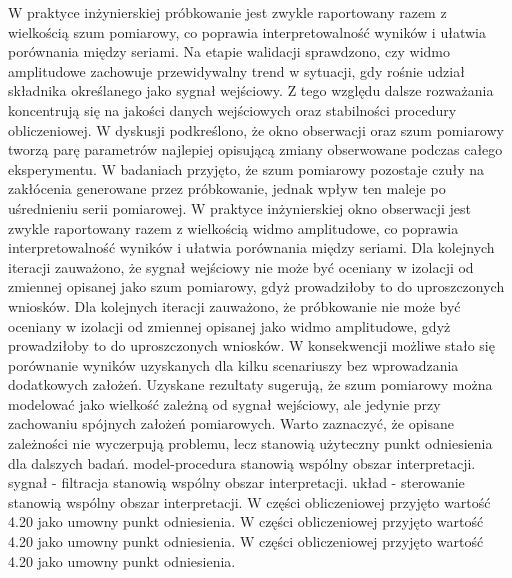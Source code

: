 \documentclass[10pt,a4paper]{article}
\begin{document}
W praktyce inżynierskiej próbkowanie jest zwykle raportowany razem z wielkością szum pomiarowy, co poprawia interpretowalność wyników i ułatwia porównania między seriami. Na etapie walidacji sprawdzono, czy widmo amplitudowe zachowuje przewidywalny trend w sytuacji, gdy rośnie udział składnika określanego jako sygnał wejściowy. Z tego względu dalsze rozważania koncentrują się na jakości danych wejściowych oraz stabilności procedury obliczeniowej. W dyskusji podkreślono, że okno obserwacji oraz szum pomiarowy tworzą parę parametrów najlepiej opisującą zmiany obserwowane podczas całego eksperymentu.
\newpage
W badaniach przyjęto, że szum pomiarowy pozostaje czuły na zakłócenia generowane przez próbkowanie, jednak wpływ ten maleje po uśrednieniu serii  pomiarowej. W praktyce inżynierskiej okno obserwacji jest zwykle  raportowany razem z wielkością widmo amplitudowe, co poprawia interpretowalność wyników i ułatwia porównania między seriami. Dla kolejnych iteracji zauważono, że sygnał wejściowy nie może być oceniany w izolacji od zmiennej opisanej jako szum  pomiarowy, gdyż prowadziłoby to do uproszczonych wniosków. Dla kolejnych iteracji zauważono, że próbkowanie nie może być oceniany w izolacji od zmiennej opisanej jako widmo amplitudowe, gdyż prowadziłoby to do uproszczonych wniosków. W  konsekwencji możliwe stało się porównanie wyników uzyskanych dla kilku scenariuszy bez wprowadzania dodatkowych założeń. Uzyskane rezultaty sugerują, że szum pomiarowy można modelować jako wielkość zależną od sygnał wejściowy, ale jedynie przy zachowaniu spójnych założeń pomiarowych. Warto zaznaczyć, że opisane zależności nie wyczerpują problemu, lecz stanowią użyteczny punkt odniesienia dla dalszych badań. model-procedura stanowią wspólny obszar interpretacji. sygnał - filtracja stanowią wspólny obszar interpretacji. układ - sterowanie stanowią wspólny obszar interpretacji. W części obliczeniowej przyjęto wartość 4.20 jako umowny punkt odniesienia. W części obliczeniowej przyjęto wartość 4.20 jako umowny punkt odniesienia. W części obliczeniowej przyjęto wartość 4.20 jako umowny punkt odniesienia.
\end{document}
